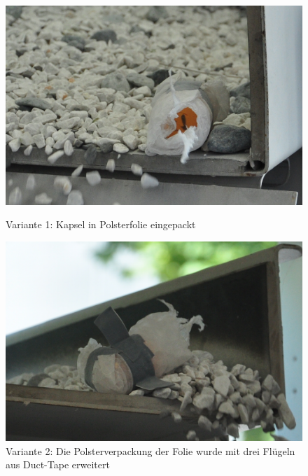 \begin{figure}[htb]
	\centering
	\begin{minipage}[t]{0.49\linewidth}
		\centering
		\includegraphics[width=1\linewidth]{images/k4-polsterfolie.JPG}
		\caption{Variante 1: Kapsel in Polsterfolie eingepackt}
		\label{fig:k4_polsterfolie}
	\end{minipage}%
	\hfill
	\begin{minipage}[t]{0.49\linewidth}
		\centering
		\includegraphics[width=\linewidth]{images/k4-fluegel.JPG}
		\caption{Variante 2: Die Polsterverpackung der Folie wurde mit drei Flügeln aus Duct-Tape erweitert}
		\label{fig:k4_fluegel}
	\end{minipage}
\end{figure}

